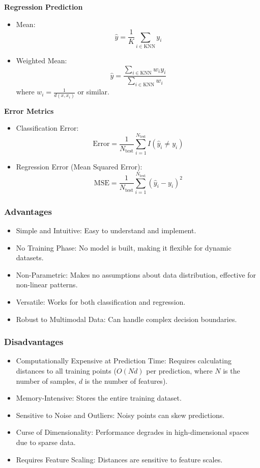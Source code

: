\smallskip
\textbf{Regression Prediction}

\begin{itemize}
    \item Mean:
        \[\hat{y} = \frac{1}{K} \sum_{i \in \text{KNN}} y_i\]

    \item Weighted Mean:
        \[\hat{y} = \frac{\sum_{i \in \text{KNN}} w_i y_i}{\sum_{i \in \text{KNN}} w_i}\]
        where $w_i = \frac{1}{d(x, x_i)}$ or similar.
\end{itemize}

\smallskip
\textbf{Error Metrics}
\begin{itemize}
    \item Classification Error:
        \[\text{Error} = \frac{1}{N_{\text{test}}} \sum_{i=1}^{N_{\text{test}}} I(\hat{y}_i \neq y_i)\]

    \item Regression Error (Mean Squared Error):
        \[\text{MSE} = \frac{1}{N_{\text{test}}} \sum_{i=1}^{N_{\text{test}}} (\hat{y}_i - y_i)^2\]
\end{itemize}

\subsubsection{Advantages}

\begin{itemize}
    \item Simple and Intuitive: Easy to understand and implement.
    \item No Training Phase: No model is built, making it flexible for dynamic datasets.
    \item Non-Parametric: Makes no assumptions about data distribution, effective for non-linear patterns.
    \item Versatile: Works for both classification and regression.
    \item Robust to Multimodal Data: Can handle complex decision boundaries.
\end{itemize}

\subsubsection{Disadvantages}
\begin{itemize}
    \item Computationally Expensive at Prediction Time: Requires calculating distances to all training points ($O(Nd)$ per prediction, where $N$ is the number of samples, $d$ is the number of features).
    \item Memory-Intensive: Stores the entire training dataset.
    \item Sensitive to Noise and Outliers: Noisy points can skew predictions.
    \item Curse of Dimensionality: Performance degrades in high-dimensional spaces due to sparse data.
    \item Requires Feature Scaling: Distances are sensitive to feature scales.
\end{itemize}